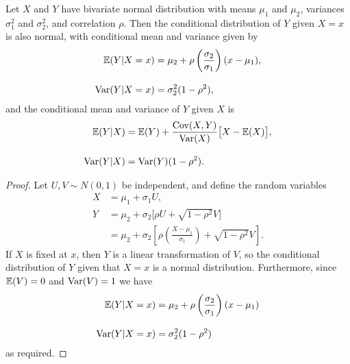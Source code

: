\begin{theorem}
Let $X$ and $Y$ have bivariate normal distribution with means $\mu_1$ and $\mu_2$, variances $\sigma_1^2$ and $\sigma_2^2$, and correlation $\rho$.
Then the conditional distribution of $Y$ given $X=x$ is also normal, with conditional mean and variance given by
\begin{align*}
\mathbb{E}(Y|X=x)	& = \mu_2 + \rho\left(\frac{\sigma_2}{\sigma_1}\right)(x - \mu_1), \\[2ex]
\text{Var}(Y|X=x) 	& = \sigma_2^2(1-\rho^2),
\end{align*}
and the conditional mean and variance of $Y$ given $X$ is 
\begin{align*}
\mathbb{E}(Y|X)	& = \mathbb{E}(Y) + \frac{\text{Cov}(X,Y)}{\text{Var}(X)}\big[X - \mathbb{E}(X)\big], \\[2ex]
\text{Var}(Y|X) 	& = \text{Var}(Y)(1-\rho^2).
\end{align*}
\end{theorem}

\begin{proof}
Let $U,V\sim N(0,1)$ be independent, and define the random variables
\begin{align*}
X & = \mu_1 + \sigma_1 U, \\
Y & = \mu_2 + \sigma_2\big[\rho U +\sqrt{1-\rho^2}V\big] \\
	& = \mu_2 + \sigma_2\left[\rho \left(\frac{X-\mu_1}{\sigma_1}\right) +\sqrt{1-\rho^2}V\right].
\end{align*}
If $X$ is fixed at $x$, then $Y$ is a linear transformation of $V$, so the conditional distribution of $Y$ given that $X=x$ is a normal distribution. 
Furthermore, since $\mathbb{E}(V)=0$ and $\text{Var}(V)=1$ we have
\begin{align*}
\mathbb{E}(Y|X=x) 	& = \mu_2 + \rho\left(\frac{\sigma_2}{\sigma_1}\right)(x - \mu_1) \\[2ex]
\text{Var}(Y|X=x)	& = \sigma_2^2(1-\rho^2)
\end{align*}
as required.
\end{proof}

